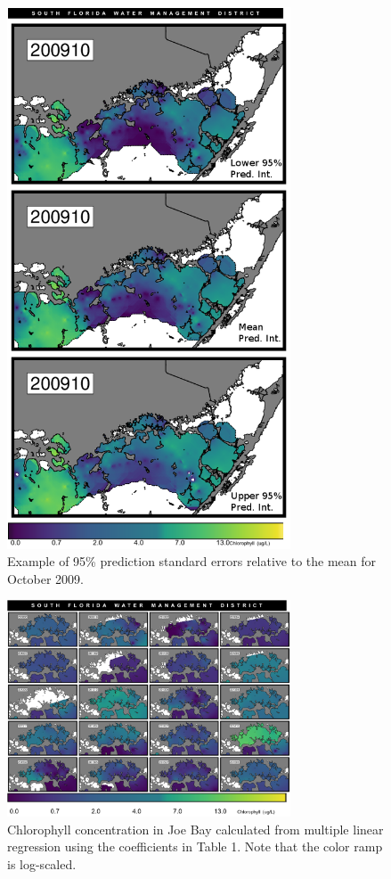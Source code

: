 \begin{figure}
  \centering
  \includegraphics[width=0.75\textwidth]{../../figures/200910_chl-sefit.png}
  \caption{Example of 95\% prediction standard errors relative to the mean for October 2009.}
  \label{fig:a2}
\end{figure}

\begin{figure}
  \centering
  \includegraphics[width=0.75\textwidth]{../../figures/multipanel_jb.png}
  \caption{Chlorophyll concentration in Joe Bay calculated from multiple linear regression using the coefficients in Table 1. Note that the color ramp is log-scaled.}
  \label{fig:a3}
\end{figure}

